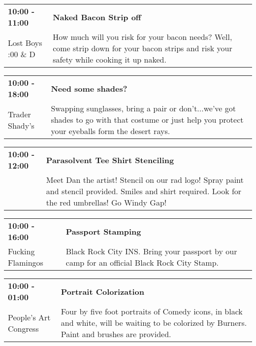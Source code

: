 \begin{tabular}{ p{1in} p{2.2in} }
    \textbf{10:00 - 11:00} & \textbf{Naked Bacon Strip off} \\
    Lost Boys \newline 4:00 \& D & How much will you risk for your bacon needs? Well, come strip down for your bacon strips and risk your safety while cooking it up naked. \\
    \hline 
\end{tabular}
    
\begin{tabular}{ p{1in} p{2.2in} }
    \textbf{10:00 - 18:00} & \textbf{Need some shades?} \\
    Trader Shady's \newline  & Swapping sunglasses, bring a pair or don't...we've got shades to go with that costume or just help you protect your eyeballs form the desert rays. \\
    \hline 
\end{tabular}
    
\begin{tabular}{ p{1in} p{2.2in} }
    \textbf{10:00 - 12:00} & \textbf{Parasolvent Tee Shirt Stenciling } \\
    ~ \newline  & Meet Dan the artist! Stencil on our rad logo! Spray paint and stencil provided. Smiles and shirt required. Look for the red umbrellas! Go Windy Gap! \\
    \hline 
\end{tabular}
    
\begin{tabular}{ p{1in} p{2.2in} }
    \textbf{10:00 - 16:00} & \textbf{Passport Stamping} \\
    Fucking Flamingos \newline  & Black Rock City INS. Bring your passport by our camp for an official Black Rock City Stamp. \\
    \hline 
\end{tabular}
    
\begin{tabular}{ p{1in} p{2.2in} }
    \textbf{10:00 - 01:00} & \textbf{Portrait Colorization} \\
    People's Art Congress \newline  & Four by five foot portraits of Comedy icons, in black and white, will be waiting to be colorized by Burners. Paint and brushes are provided. \\
    \hline 
\end{tabular}
    
